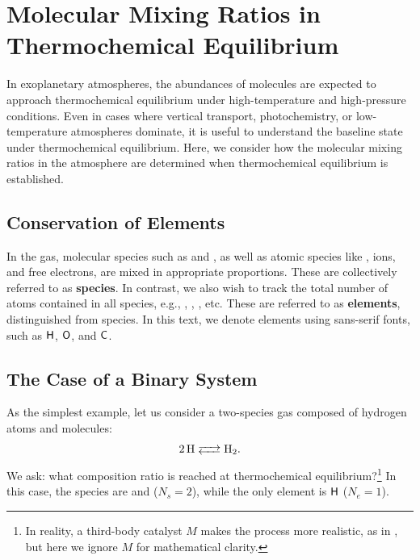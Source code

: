 \section{Molecular Mixing Ratios in Thermochemical Equilibrium}

In exoplanetary atmospheres, the abundances of molecules are expected to approach thermochemical equilibrium under high-temperature and high-pressure conditions. Even in cases where vertical transport, photochemistry, or low-temperature atmospheres dominate, it is useful to understand the baseline state under thermochemical equilibrium. Here, we consider how the molecular mixing ratios in the atmosphere are determined when thermochemical equilibrium is established. \\

\subsection*{Conservation of Elements}

In the gas, molecular species such as  and , as well as atomic species like , ions, and free electrons, are mixed in appropriate proportions. These are collectively referred to as {\bf species}. In contrast, we also wish to track the total number of atoms contained in all species, e.g., , , , etc. These are referred to as {\bf elements}, distinguished from species. In this text, we denote elements using sans-serif fonts, such as $\mathsf{H}$, $\mathsf{O}$, and $\mathsf{C}$. \\


\subsection*{The Case of a Binary System}

As the simplest example, let us consider a two-species gas composed of hydrogen atoms and molecules:
\begin{align*}
\ce{2 H <--> H2}.
\end{align*}
We ask: what composition ratio is reached at thermochemical equilibrium?\footnote{In reality, a third-body catalyst $M$ makes the process more realistic, as in , but here we ignore $M$ for mathematical clarity.}  
In this case, the species are  and  ($N_s = 2$), while the only element is $\mathsf{H}$ ($N_e = 1$).

